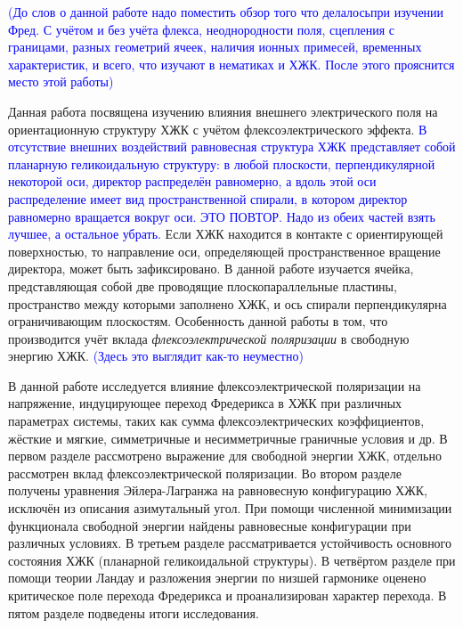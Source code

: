 \textcolor{blue}{(До слов о данной работе надо поместить обзор того что делалосьпри изучении Фред.  С учётом и без учёта флекса, неоднородности поля, сцепления с границами, разных геометрий ячеек, наличия ионных примесей, временных характеристик, и всего, что изучают в нематиках и ХЖК. После этого прояснится место этой работы)}

Данная работа посвящена изучению влияния внешнего электрического поля на ориентационную структуру ХЖК с учётом флексоэлектрического эффекта.
\textcolor{blue}{В отсутствие внешних воздействий равновесная структура ХЖК представляет собой планарную геликоидальную структуру: в любой плоскости, перпендикулярной некоторой оси, директор распределён равномерно, а вдоль этой оси распределение имеет вид пространственной спирали, в котором директор равномерно вращается вокруг оси. ЭТО ПОВТОР. Надо из обеих частей взять лучшее, а остальное убрать.}
Если ХЖК находится в контакте с ориентирующей поверхностью, то направление оси, определяющей пространственное вращение директора, может быть зафиксировано.
В данной работе изучается ячейка, представляющая собой две проводящие плоскопараллельные пластины, пространство между которыми заполнено ХЖК, и ось спирали перпендикулярна ограничивающим плоскостям.
Особенность данной работы в том, что производится учёт вклада \textit{флексоэлектрической поляризации} в свободную энергию ХЖК. \textcolor{blue}{(Здесь это выглядит как-то неуместно)}


В данной работе исследуется влияние флексоэлектрической поляризации на напряжение, индуцирующее переход Фредерикса в ХЖК при различных параметрах системы, таких как сумма флексоэлектрических коэффициентов, жёсткие и мягкие, симметричные и несимметричные граничные условия и др. В первом разделе рассмотрено выражение для свободной энергии ХЖК, отдельно рассмотрен вклад флексоэлектрической поляризации. Во втором разделе получены уравнения Эйлера-Лагранжа на равновесную конфигурацию ХЖК, исключён из описания азимутальный угол. При помощи численной минимизации функционала свободной энергии найдены равновесные конфигурации при различных условиях. В третьем разделе рассматривается устойчивость основного состояния ХЖК (планарной геликоидальной структуры). В четвёртом разделе при помощи теории Ландау и разложения энергии по низшей гармонике оценено критическое поле перехода Фредерикса и проанализирован характер перехода. В пятом разделе подведены итоги исследования.

